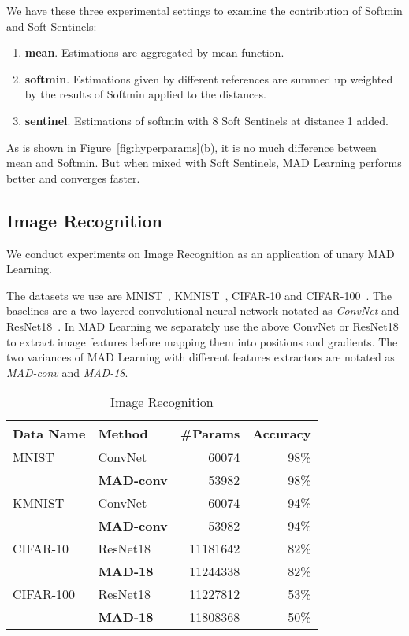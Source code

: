 \documentclass{article}
\begin{document}
We have these three experimental settings to examine the contribution of
Softmin and Soft Sentinels:

\begin{enumerate}
\item
  \textbf{mean}. Estimations are aggregated by mean function.
\item
  \textbf{softmin}. Estimations given by different references are summed
  up weighted by the results of Softmin applied to the distances.
\item
  \textbf{sentinel}. Estimations of softmin with 8 Soft Sentinels at distance 1 added.
\end{enumerate}

As is shown in Figure~\ref{fig:hyperparams}(b), it is no much difference between
mean and Softmin. But when mixed with Soft Sentinels, MAD Learning performs
better and converges faster.



\hypertarget{image-recognition}{\subsection{Image Recognition}\label{ssec:image-recognition}}

We conduct experiments on Image Recognition as an application of unary MAD Learning.

The datasets we use are MNIST~\cite{lecun1998gradient}, KMNIST~\cite{clanuwat2018deep},
CIFAR-10 and CIFAR-100~\cite{krizhevsky2009learning}. The
baselines are a two-layered convolutional neural network notated as
\emph{ConvNet} and ResNet18~\cite{1512.03385v1}.
In MAD Learning we separately use the above ConvNet or ResNet18 to
extract image features before mapping them into positions and gradients.
The two variances of MAD Learning with different features extractors are
notated as \emph{MAD-conv} and \emph{MAD-18}.

\begin{table}
\centering
\begin{tabular}{llrr}
\toprule
Data Name & Method & \#Params & Accuracy\\
\midrule
MNIST      & ConvNet           & 60074    & 98\%\\
           & \textbf{MAD-conv} & 53982    & 98\%\\
KMNIST     & ConvNet           & 60074    & 94\%\\
           & \textbf{MAD-conv} & 53982    & 94\%\\
CIFAR-10   & ResNet18          & 11181642 & 82\%\\
           & \textbf{MAD-18}   & 11244338 & 82\%\\
CIFAR-100  & ResNet18          & 11227812 & 53\%\\
           & \textbf{MAD-18}   & 11808368 & 50\%\\
\bottomrule
\end{tabular}
\caption{Image Recognition}
\label{tbl:image-recognition}
\end{table}
\end{document}
